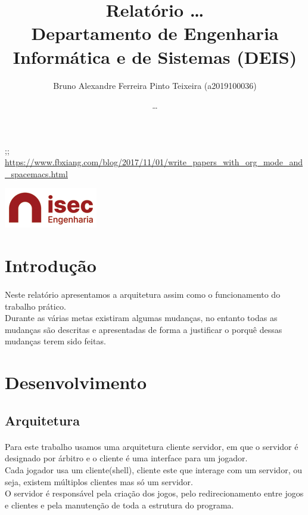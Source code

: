 \documentclass[letterpaper, 11pt]{article}
\author{Bruno Alexandre Ferreira Pinto Teixeira (a2019100036)}
\date{\ldots{}}
\title{Relatório \ldots{}\\\medskip
\large Departamento de Engenharia Informática e de Sistemas (DEIS)}
\begin{document}
\maketitle
;; \url{https://www.fbxiang.com/blog/2017/11/01/write\_papers\_with\_org\_mode\_and\_spacemacs.html}

\begin{center}
\includegraphics[width=5 cm]{images/isec.png}
\end{center}

\clearpage
\tableofcontents
\clearpage

\listoffigures
\clearpage

\section{Introdução}
\label{sec:org16d332e}
\paragraph{}
Neste relatório apresentamos a arquitetura assim como o funcionamento do trabalho prático.\\
Durante as várias metas existiram algumas mudanças, no entanto todas as mudanças são descritas e apresentadas de forma a justificar o porquê dessas mudanças terem sido feitas.

\clearpage

\section{Desenvolvimento}
\label{sec:org99c3fd6}

\subsection{Arquitetura}
\label{sec:org3d5d926}

\paragraph{}
Para este trabalho usamos uma arquitetura cliente servidor, em que o servidor é designado por árbitro e o cliente é uma interface para um jogador.\\
Cada jogador usa um cliente(shell), cliente este que interage com um servidor, ou seja, existem múltiplos clientes mas só um servidor.\\
O servidor é responsável pela criação dos jogos, pelo redirecionamento entre jogos e clientes e pela manutenção de toda a estrutura do programa.
\end{document}
